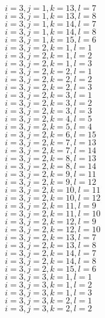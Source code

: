 \documentclass[14pt]{article}
\begin{document}
    $i=3,j=1,k=13,l=7 $ \\ 
    $i=3,j=1,k=13,l=8 $ \\ 
    $i=3,j=1,k=14,l=7 $ \\ 
    $i=3,j=1,k=14,l=8 $ \\ 
    $i=3,j=1,k=15,l=6 $ \\ 
    $i=3,j=2,k=1,l=1 $ \\ 
    $i=3,j=2,k=1,l=2 $ \\ 
    $i=3,j=2,k=1,l=3 $ \\ 
    $i=3,j=2,k=2,l=1 $ \\ 
    $i=3,j=2,k=2,l=2 $ \\ 
    $i=3,j=2,k=2,l=3 $ \\ 
    $i=3,j=2,k=3,l=1 $ \\ 
    $i=3,j=2,k=3,l=2 $ \\ 
    $i=3,j=2,k=3,l=3 $ \\ 
    $i=3,j=2,k=4,l=5 $ \\ 
    $i=3,j=2,k=5,l=4 $ \\ 
    $i=3,j=2,k=6,l=15 $ \\ 
    $i=3,j=2,k=7,l=13 $ \\ 
    $i=3,j=2,k=7,l=14 $ \\ 
    $i=3,j=2,k=8,l=13 $ \\ 
    $i=3,j=2,k=8,l=14 $ \\ 
    $i=3,j=2,k=9,l=11 $ \\ 
    $i=3,j=2,k=9,l=12 $ \\ 
    $i=3,j=2,k=10,l=11 $ \\ 
    $i=3,j=2,k=10,l=12 $ \\ 
    $i=3,j=2,k=11,l=9 $ \\ 
    $i=3,j=2,k=11,l=10 $ \\ 
    $i=3,j=2,k=12,l=9 $ \\ 
    $i=3,j=2,k=12,l=10 $ \\ 
    $i=3,j=2,k=13,l=7 $ \\ 
    $i=3,j=2,k=13,l=8 $ \\ 
    $i=3,j=2,k=14,l=7 $ \\ 
    $i=3,j=2,k=14,l=8 $ \\ 
    $i=3,j=2,k=15,l=6 $ \\ 
    $i=3,j=3,k=1,l=1 $ \\ 
    $i=3,j=3,k=1,l=2 $ \\ 
    $i=3,j=3,k=1,l=3 $ \\ 
    $i=3,j=3,k=2,l=1 $ \\ 
    $i=3,j=3,k=2,l=2 $ \\ 
\end{document}
